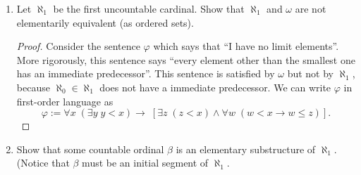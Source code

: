 \documentclass{article}
\begin{document}
\begin{enumerate}[label={\bf Q\arabic*:}]
\begin{enumerate}[label={\bf(\arabic*)}]
\begin{proof}


        \end{proof}

      \item Let $\aleph_1$ be the first uncountable cardinal. Show that
        $\aleph_1$ and $\omega$ are not elementarily equivalent (as ordered
        sets).
        \begin{proof}
          Consider the sentence $\varphi$ which says that ``I have no limit
          elements''. More rigorously, this sentence says ``every element
          other than the smallest one has an immediate predecessor''. This
          sentence is satisfied by $\omega$ but not by $\aleph_1$, because
          $\aleph_0\in\aleph_1$ does not have a immediate predecessor. We
          can write $\varphi$ in first-order language as
          \[\varphi:= \forall x\; (\exists y\; y<x)\rightarrow\;
            \left[\exists z\; (z<x)\wedge \forall w\; (w<x\rightarrow w\leq
            z) \right].\]
        \end{proof}

      \item Show that some countable ordinal $\beta$ is an elementary
        substructure of $\aleph_1$. (Notice that $\beta$ must be an initial
        segment of $\aleph_1$.


\end{enumerate}
\end{enumerate}
\end{document}
